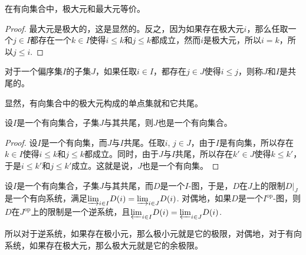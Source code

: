 \begin{lem}
在有向集合中，极大元和最大元等价。
\end{lem}

\begin{proof}
最大元是极大的，这是显然的。反之，因为如果存在极大元$i$，那么任取一个$j\in I$都存在一个$k\in I$使得$i\leq k$和$j\leq k$都成立，然而$i$是极大元，所以$i=k$，所以$j\leq i$. 
\end{proof}

\begin{para}
对于一个偏序集$I$的子集$J$，如果任取$i\in I$，都存在$j\in J$使得$i\leq j$，则称$J$和$I$是共尾的。
\end{para}

显然，有向集合中的极大元构成的单点集就和它共尾。

\begin{lem}
设$I$是一个有向集合，子集$J$与其共尾，则$J$也是一个有向集合。
\end{lem}

\begin{proof}
设$I$是一个有向集，而$J$与$I$共尾。任取$i$, $j\in J$，由于$I$是有向集，所以存在$k\in I$使得$i\leq k$和$j\leq k$都成立。同时，由于$J$与$I$共尾，所以存在$k'\in J$使得$k\leq k'$，于是$i\leq k'$和$j\leq k'$成立。这就是说，$J$也是一个有向集。
\end{proof}

\begin{pro}
设$I$是一个有向集合，子集$J$与其共尾，而$D$是一个$I$-图，于是，$D$在$J$上的限制$D|_J$是一个有向系统，满足${\varinjlim}_{i\in I} D(i)={\varinjlim}_{i\in J} D(i)$. 对偶地，如果$D$是一个$I^\mathrm{op}$-图，则$D$在$J^\mathrm{op}$上的限制是一个逆系统，且${\varprojlim}_{i\in I} D(i)={\varprojlim}_{i\in J} D(i)$.
\end{pro}

所以对于逆系统，如果存在极小元，那么极小元就是它的极限，对偶地，对于有向系统，如果存在极大元，那么极大元就是它的余极限。%

